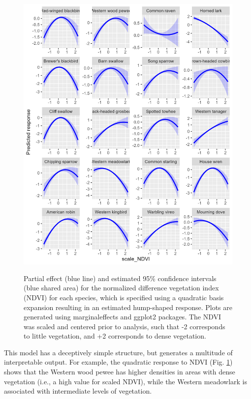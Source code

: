 \begin{figure}[!ht]
    \caption[Quadratic response to NDVI]{Partial effect (blue line) and estimated 95\% confidence intervals (blue shared area) for the normalized difference vegetation index (NDVI) for each species, which is specified using a quadratic basis expansion resulting in an estimated hump-shaped response.  Plots are generated using \colorbox{backcolour}{marginaleffects} and \colorbox{backcolour}{ggplot2} packages.  The NDVI was scaled and centered prior to analysis, such that -2 corresponds to little vegetation, and +2 corresponds to dense vegetation.}
    \includegraphics[width=5.5in]{Chap_11/Covariates-NDVI.png}
    \label{fig:Chap11_NDVI_response}
\end{figure}

This model has a deceptively simple structure, but generates a multitude of interpretable output. For example, the quadratic response to NDVI (Fig. \ref{fig:Chap11_NDVI_response}) shows that the Western wood pewee has higher densities in areas with dense vegetation (i.e., a high value for scaled NDVI), while the Western meadowlark is associated with intermediate levels of vegetation.  


